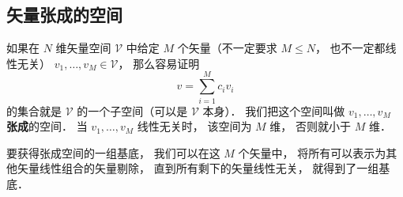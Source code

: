 \subsection{矢量张成的空间}
如果在 $N$ 维矢量空间 $\mathcal V$ 中给定 $M$ 个矢量（不一定要求 $M \leqslant N$， 也不一定都线性无关） ${v_1}, \dots, {v_M} \in \mathcal V$， 那么容易证明
\begin{equation}
{v} = \sum_{i=1}^M c_i {v_i}
\end{equation}
的集合就是 $\mathcal V$ 的一个子空间（可以是 $\mathcal V$ 本身）． 我们把这个空间叫做 ${v_1}, \dots, {v_M}$ \textbf{张成}的空间． 当 ${v_1}, \dots, {v_M}$ 线性无关时， 该空间为 $M$ 维， 否则就小于 $M$ 维．

要获得张成空间的一组基底， 我们可以在这 $M$ 个矢量中， 将所有可以表示为其他矢量线性组合的矢量剔除， 直到所有剩下的矢量线性无关， 就得到了一组基底．
